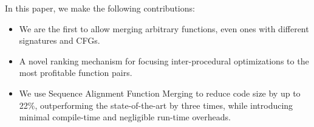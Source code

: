 In this paper, we make the following contributions:
\begin{itemize}[noitemsep,topsep=3pt]
  \item We are the first to allow merging arbitrary functions, even ones with
    different signatures and CFGs.
  \item A novel ranking mechanism for focusing inter-procedural optimizations
    to the most profitable function pairs.
  \item We use Sequence Alignment Function Merging to reduce code size by up to
    22\%, outperforming the state-of-the-art by three times, while introducing
    minimal compile-time and negligible run-time overheads.
\end{itemize}





